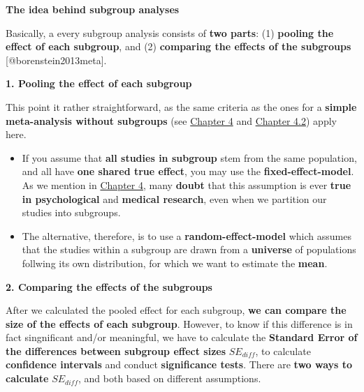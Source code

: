\documentclass[]{book}
\providecommand{\tightlist}{%
  \setlength{\itemsep}{0pt}\setlength{\parskip}{0pt}}
\theoremstyle{definition}
\theoremstyle{definition}
\theoremstyle{definition}
\theoremstyle{remark}
\begin{document}
\begin{rmdinfo}
\textbf{The idea behind subgroup analyses}

Basically, a every subgroup analysis consists of \textbf{two parts}: (1)
\textbf{pooling the effect of each subgroup}, and (2) \textbf{comparing
the effects of the subgroups} {[}@borenstein2013meta{]}.

\textbf{1. Pooling the effect of each subgroup}

This point it rather straightforward, as the same criteria as the ones
for a \textbf{simple meta-analysis without subgroups} (see
\protect\hyperlink{pool}{Chapter 4} and
\protect\hyperlink{random}{Chapter 4.2}) apply here.

\begin{itemize}
\tightlist
\item
  If you assume that \textbf{all studies in subgroup} stem from the same
  population, and all have \textbf{one shared true effect}, you may use
  the \textbf{fixed-effect-model}. As we mention in
  \protect\hyperlink{pool}{Chapter 4}, many \textbf{doubt} that this
  assumption is ever \textbf{true in psychological} and \textbf{medical
  research}, even when we partition our studies into subgroups.
\item
  The alternative, therefore, is to use a \textbf{random-effect-model}
  which assumes that the studies within a subgroup are drawn from a
  \textbf{universe} of populations follwing its own distribution, for
  which we want to estimate the \textbf{mean}.
\end{itemize}

\textbf{2. Comparing the effects of the subgroups}

After we calculated the pooled effect for each subgroup, \textbf{we can
compare the size of the effects of each subgroup}. However, to know if
this difference is in fact singnificant and/or meaningful, we have to
calculate the \textbf{Standard Error of the differences between subgroup
effect sizes} \(SE_{diff}\), to calculate \textbf{confidence intervals}
and conduct \textbf{significance tests}. There are \textbf{two ways to
calculate} \(SE_{diff}\), and both based on different assumptions.


\end{rmdinfo}
\end{document}
